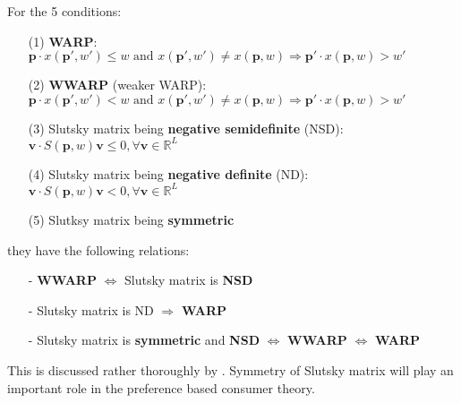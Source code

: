 For the 5 conditions:
    \begin{enumerate}
        \item[(1)] \textbf{WARP}: $\mathbf{p}\cdot  x(\mathbf{p}',w')\leq w\text{ and } x(\mathbf{p}',w')\neq  x(\mathbf{p},w)\Rightarrow \mathbf{p}'\cdot x(\mathbf{p},w)>w'$
        \item[(2)] \textbf{WWARP} (weaker WARP): $\mathbf{p}\cdot  x(\mathbf{p}',w')< w\text{ and } x(\mathbf{p}',w')\neq  x(\mathbf{p},w)\Rightarrow \mathbf{p}'\cdot x(\mathbf{p},w)>w'$
        \item[(3)] Slutsky matrix being \textbf{negative semidefinite} (NSD): $\mathbf{v}\cdot S(\mathbf{p},w)\mathbf{v}\leq 0, \forall \mathbf{v}\in\mathbb{R}^L$
        \item[(4)] Slutsky matrix being \textbf{negative definite} (ND): $\mathbf{v}\cdot S(\mathbf{p},w)\mathbf{v}< 0, \forall \mathbf{v}\in\mathbb{R}^L$
        \item[(5)] Slutksy matrix being \textbf{symmetric} 
    \end{enumerate}

    they have the following relations:
    \begin{enumerate}
        \item[-] \textbf{WWARP} $\Leftrightarrow$ Slutsky matrix is \textbf{NSD} 
        \item[-] Slutsky matrix is ND $\Rightarrow$ \textbf{WARP} 
        \item[-] Slutsky matrix is \textbf{symmetric} and \textbf{NSD} $\Leftrightarrow$ \textbf{WWARP} $\Leftrightarrow$ \textbf{WARP}
    \end{enumerate}
    
    This is discussed rather thoroughly by \citet{kihlstrom1976demand}. Symmetry of Slutsky matrix will play an important role in the preference based consumer theory.
